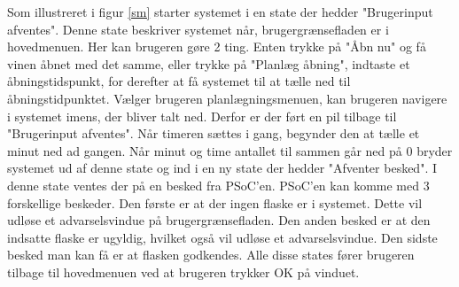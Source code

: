 Som illustreret i figur \ref{sm} starter systemet i en state der hedder "Brugerinput afventes". Denne state beskriver systemet når, brugergrænsefladen er i hovedmenuen. Her kan brugeren gøre 2 ting. Enten trykke på "Åbn nu" og få vinen åbnet med det samme, eller trykke på "Planlæg åbning", indtaste et åbningstidspunkt, for derefter at få systemet til at tælle ned til åbningstidpunktet. Vælger brugeren planlægningsmenuen, kan brugeren navigere i systemet imens, der bliver talt ned. Derfor er der ført en pil tilbage til "Brugerinput afventes". Når timeren sættes i gang, begynder den at tælle et minut ned ad gangen. Når minut og time antallet til sammen går ned på 0 bryder systemet ud af denne state og ind i en ny state der hedder "Afventer besked". I denne state ventes der på en besked fra PSoC'en. PSoC'en kan komme med 3 forskellige beskeder. Den første er at der ingen flaske er i systemet. Dette vil udløse et advarselsvindue på brugergrænsefladen. Den anden besked er at den indsatte flaske er ugyldig, hvilket også vil udløse et advarselsvindue. Den sidste besked man kan få er at flasken godkendes. Alle disse states fører brugeren tilbage til hovedmenuen ved at brugeren trykker OK på vinduet.
